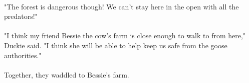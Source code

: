 \paragraph{} "The forest is dangerous though! We can't stay here in the open with all the predators!"
 \paragraph{} "I think my friend Bessie the cow's farm is close enough to walk to from here," Duckie said. "I think she will be able to help keep us safe from the goose authorities."
 \paragraph{} Together, they waddled to Bessie's farm.
